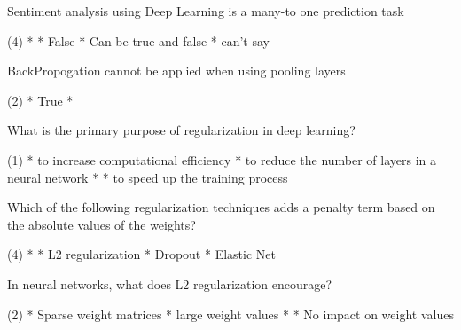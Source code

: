 \documentclass[11pt]{extarticle}
\begin{document}
\begin{exercise}
    Sentiment analysis using Deep Learning is a many-to one prediction task
    \begin{choice} (4)
        * 
        * False
        * Can be true and false
        * can't say
    \end{choice}
\end{exercise}
\begin{solution}
\end{solution}


\begin{exercise}
    BackPropogation cannot be applied when using pooling layers
    \begin{choice}(2)
        * True
        * 
    \end{choice}
\end{exercise}
\begin{solution}
\end{solution}

\begin{exercise}
    What is the primary purpose of regularization in deep learning?
    \begin{choice}(1)
        * to increase computational efficiency
        * to reduce the number of layers in a neural network
        * 
        * to speed up the training process
    \end{choice}
\end{exercise}
\begin{solution}
\end{solution}

\begin{exercise}
    Which of the following regularization techniques adds a penalty term based on the absolute values of the weights?
    \begin{choice} (4)
        * 
        * L2 regularization
        * Dropout
        * Elastic Net
    \end{choice}
\end{exercise}
\begin{solution}
\end{solution}

\begin{exercise}
    In neural networks, what does L2 regularization encourage?
    \begin{choice} (2)
        * Sparse weight matrices
        * large weight values
        * 
        * No impact on weight values
    \end{choice}
\end{exercise}
\begin{solution}
\end{solution}
\end{document}
